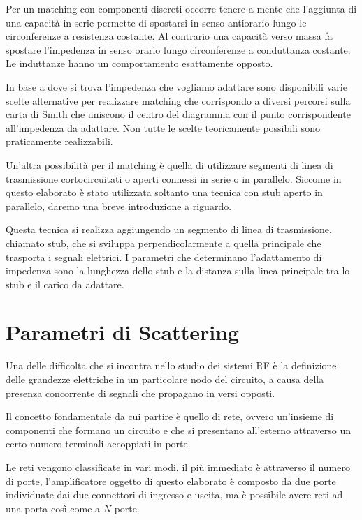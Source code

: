 \documentclass[12pt,oneside]{book}
\begin{document}
Per un matching con componenti discreti occorre tenere a mente che l'aggiunta di una capacità in serie permette di spostarsi in senso antiorario lungo le circonferenze a resistenza costante. Al contrario una capacità verso massa fa spostare l'impedenza in senso orario lungo circonferenze a conduttanza costante. Le induttanze hanno un comportamento esattamente opposto.

In base a dove si trova l'impedenza che vogliamo adattare sono disponibili varie scelte alternative per realizzare matching che corrispondo a diversi percorsi sulla carta di Smith che uniscono il centro del diagramma con il punto corrispondente all'impedenza da adattare. Non tutte le scelte teoricamente possibili sono praticamente realizzabili.

Un'altra possibilità per il matching è quella di utilizzare segmenti di linea di trasmissione cortocircuitati o aperti connessi in serie o in parallelo. Siccome in questo elaborato è stato utilizzata soltanto una tecnica con stub aperto in parallelo, daremo una breve introduzione a riguardo.

Questa tecnica si realizza aggiungendo un segmento di linea di trasmissione, chiamato stub, che si sviluppa perpendicolarmente a quella principale che trasporta i segnali elettrici. I parametri che determinano l'adattamento di impedenza sono la lunghezza dello stub e la distanza sulla linea principale tra lo stub e il carico da adattare.




\section{Parametri di Scattering}
Una delle difficolta che si incontra nello studio dei sistemi RF è la definizione delle grandezze elettriche in un particolare nodo del circuito, a causa della presenza concorrente di segnali che propagano in versi opposti.

Il concetto fondamentale da cui partire è quello di rete, ovvero un'insieme di componenti che formano un circuito e che si presentano all'esterno attraverso un certo numero terminali accoppiati in porte.

Le reti vengono classificate in vari modi, il più immediato è attraverso il numero di porte, l'amplificatore oggetto di questo elaborato è composto da due porte individuate dai due connettori di ingresso e uscita, ma è possibile avere reti ad una porta così come a $N$ porte.
\end{document}

